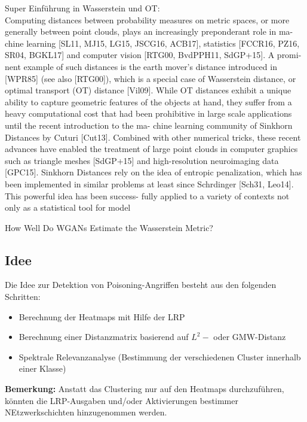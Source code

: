 \documentclass[11pt,a4paper]{article}
\numberwithin{equation}{section}
\begin{document}
	Super Einführung in Wasserstein und OT: \cite{altschuler2017near}\\
	Computing distances between probability measures on metric spaces, or more
	generally between point clouds, plays an increasingly preponderant role in ma-
	chine learning [SL11, MJ15, LG15, JSCG16, ACB17], statistics [FCCR16, PZ16,
	SR04, BGKL17] and computer vision [RTG00, BvdPPH11, SdGP+15]. A promi-
	nent example of such distances is the earth mover’s distance introduced in [WPR85]
	(see also [RTG00]), which is a special case of Wasserstein distance, or optimal
	transport (OT) distance [Vil09].
	While OT distances exhibit a unique ability to capture geometric features of
	the objects at hand, they suffer from a heavy computational cost that had been
	prohibitive in large scale applications until the recent introduction to the ma-
	chine learning community of Sinkhorn Distances by Cuturi [Cut13]. Combined
	with other numerical tricks, these recent advances have enabled the treatment
	of large point clouds in computer graphics such as triangle meshes [SdGP+15]
	and high-resolution neuroimaging data [GPC15]. Sinkhorn Distances rely on the
	idea of entropic penalization, which has been implemented in similar problems
	at least since Schrdinger [Sch31, Leo14]. This powerful idea has been success-
	fully applied to a variety of contexts not only as a statistical tool for model
	
	
	How Well Do WGANs Estimate the
	Wasserstein Metric? \cite{mallasto2019well}
	\subsection{Idee}
	Die Idee zur Detektion von Poisoning-Angriffen besteht aus den folgenden Schritten:
	
	\begin{itemize}
		\item Berechnung der Heatmaps mit Hilfe der LRP
		\item Berechnung einer Distanzmatrix basierend auf $L^2-$ oder GMW-Distanz
		\item Spektrale Relevanzanalyse (Bestimmung der verschiedenen Cluster innerhalb einer Klasse)
	\end{itemize}
	
	\noindent  \textbf{Bemerkung:} Anstatt das Clustering nur auf den Heatmaps durchzuführen, könnten die LRP-Ausgaben und/oder Aktivierungen bestimmer NEtzwerkschichten hinzugenommen werden.\\
	
\end{document}
